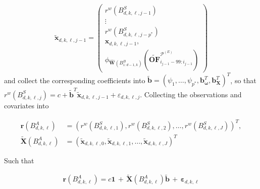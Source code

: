 \documentclass[10pt,a4paper,oneside]{article}
\providecommand{\DIFaddbegin}{} %
\providecommand{\DIFaddend}{} %
\providecommand{\DIFdelbegin}{} %
\providecommand{\DIFdelend}{} %
\newcommand{\DIFscaledelfig}{0.5}
\newlength{\DIFdelgraphicswidth} %
\newlength{\DIFdelgraphicsheight} %
\newcommand{\DIFaddincludegraphics}[2][]{{\color{blue}\fbox{\DIFOincludegraphics[#1]{#2}}}} %
\newcommand{\DIFdelincludegraphics}[2][]{%
\sbox{\DIFdelgraphicsbox}{\DIFOincludegraphics[#1]{#2}}%
\settoboxwidth{\DIFdelgraphicswidth}{\DIFdelgraphicsbox} %
\settoboxtotalheight{\DIFdelgraphicsheight}{\DIFdelgraphicsbox} %
\scalebox{\DIFscaledelfig}{%
\parbox[b]{\DIFdelgraphicswidth}{\usebox{\DIFdelgraphicsbox}\\[-\baselineskip] \rule{\DIFdelgraphicswidth}{0em}}\llap{\resizebox{\DIFdelgraphicswidth}{\DIFdelgraphicsheight}{%
\setlength{\unitlength}{\DIFdelgraphicswidth}%
\begin{picture}(1,1)%
\thicklines\linethickness{2pt} %
{\color[rgb]{1,0,0}\put(0,0){\framebox(1,1){}}}%
{\color[rgb]{1,0,0}\put(0,0){\line( 1,1){1}}}%
{\color[rgb]{1,0,0}\put(0,1){\line(1,-1){1}}}%
\end{picture}%
}\hspace*{3pt}}} %
} %
\DeclareRobustCommand{\DIFaddbegin}{\DIFOaddbegin \let\includegraphics\DIFaddincludegraphics} %
\DeclareRobustCommand{\DIFaddend}{\DIFOaddend \let\includegraphics\DIFOincludegraphics} %
\DeclareRobustCommand{\DIFdelbegin}{\DIFOdelbegin \let\includegraphics\DIFdelincludegraphics} %
\DeclareRobustCommand{\DIFdelend}{\DIFOaddend \let\includegraphics\DIFOincludegraphics} %
\begin{document}
\[
    \tilde{\mathbf{x}}_{d,k,\ell,j - 1}
    =
    \DIFdelbegin %
\DIFdelend \DIFaddbegin \begin{pmatrix}
        r^w \left( B^S_{d, k, \ell, j - 1} \right)   \\
        \vdots                                       \\
        r^w \left( B^S_{d, k, \ell, j - p^*} \right) \\
        \mathbf{x}_{d, k, \ell, j - 1},              \\
        \phi_{\hat{\mathbf{W}}\left( B^B_{1:d - 1, k} \right)}\left( \widetilde{\mathbf{OF}}^{\mathcal{P}^{(E)}}_{i_{j - 1} - 99:i_{j - 1}} \right)
    \end{pmatrix}\DIFaddend 
\]
and collect the corresponding coefficients into \(\tilde{\mathbf{b}} = \left( \psi_1, \dots, \psi_{p^*}, \mathbf{b}^T_{\boldsymbol{\omega}}, \mathbf{b}^T_{\mathbf{X}}\right)^T\), so that \(r^w\left( B^S_{d,k,\ell,j} \right) = c + \tilde{\mathbf{b}}^T\tilde{\mathbf{x}}_{d, k, \ell, j - 1} + \varepsilon_{d,k,\ell, j}\). Collecting the observations and covariates into

\begin{align*}
    \mathbf{r}\left( B^A_{d, k, \ell} \right)         & = \left( r^w\left( B^S_{d, k, \ell, 1} \right), r^w\left( B^S_{d, k, \ell, 2}\right), \dots, r^w\left( B^S_{d, k, \ell, J} \right) \right)^T, \\
    \tilde{\mathbf{X}}\left( B^A_{d, k, \ell} \right) & = \left( \tilde{\mathbf{x}}_{d,k,\ell,0}, \tilde{\mathbf{x}}_{d,k,\ell,1}, \dots, \tilde{\mathbf{x}}_{d,k,\ell,J}  \right)^T
\end{align*}

Such that

\begin{align*}
    \mathbf{r}\left( B^A_{d, k, \ell} \right) = c \mathbf{1} \, + \, \tilde{\mathbf{X}}\left( B^A_{d, k, \ell} \right) \tilde{\mathbf{b}} \, + \, \boldsymbol{\varepsilon}_{d, k, \ell}
\end{align*}
\end{document}
